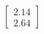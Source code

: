 \documentclass[preview]{standalone}
\begin{document}
\begin{align*}
\begin{bmatrix} 2.14 \\ 2.64 \end{bmatrix}
\end{align*}
\end{document}
